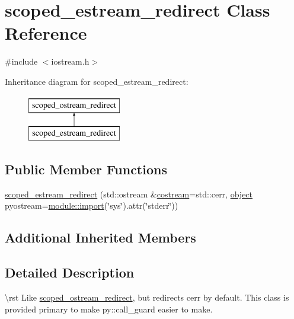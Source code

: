 \hypertarget{classscoped__estream__redirect}{}\section{scoped\+\_\+estream\+\_\+redirect Class Reference}
\label{classscoped__estream__redirect}


{\ttfamily \#include $<$iostream.\+h$>$}

Inheritance diagram for scoped\+\_\+estream\+\_\+redirect\+:\begin{figure}[H]
\begin{center}
\leavevmode
\includegraphics[height=2.000000cm]{classscoped__estream__redirect}
\end{center}
\end{figure}
\subsection*{Public Member Functions}
\begin{DoxyCompactItemize}
\item 
\mbox{\hyperlink{classscoped__estream__redirect_a85d52a127c735fd9d4abc8f3748081bd}{scoped\+\_\+estream\+\_\+redirect}} (std\+::ostream \&\mbox{\hyperlink{classscoped__ostream__redirect_a1d9b813b2e4e5bd72b1a735a9e9b13cb}{costream}}=std\+::cerr, \mbox{\hyperlink{classobject}{object}} pyostream=\mbox{\hyperlink{classmodule_a40817edef0ded5727701534bcded9982}{module\+::import}}(\char`\"{}sys\char`\"{}).attr(\char`\"{}stderr\char`\"{}))
\end{DoxyCompactItemize}
\subsection*{Additional Inherited Members}


\subsection{Detailed Description}
\textbackslash{}rst Like {\ttfamily \mbox{\hyperlink{classscoped__ostream__redirect}{scoped\+\_\+ostream\+\_\+redirect}}}, but redirects cerr by default. This class is provided primary to make {\ttfamily py\+::call\+\_\+guard} easier to make.

